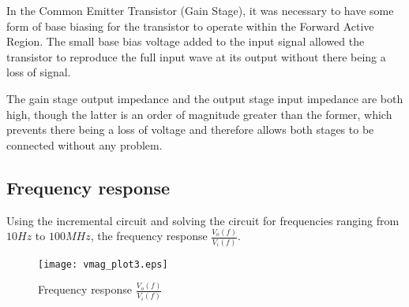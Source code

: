 In the Common Emitter Transistor (Gain Stage), it was necessary to have some form of base biasing for the transistor to operate within the Forward Active Region. The small base bias voltage added to the input signal allowed the transistor to reproduce the full input wave at its output without there being a loss of signal.

The gain stage output impedance and the output stage input impedance are both high, though the latter is an order of magnitude greater than the former, which prevents there being a loss of voltage and therefore allows both stages to be connected without any problem.




\subsection{Frequency response}
Using the incremental circuit and solving the circuit for frequencies ranging from $10 Hz$ to $100 MHz$, the frequency response $\frac{V_o(f)}{V_i(f)}$.

\begin{figure}[H] \centering
\texttt{[image: vmag\_plot3.eps]}
\caption{Frequency response $\frac{V_o(f)}{V_i(f)}$}
\label{fig:freq_response}
\end{figure}







